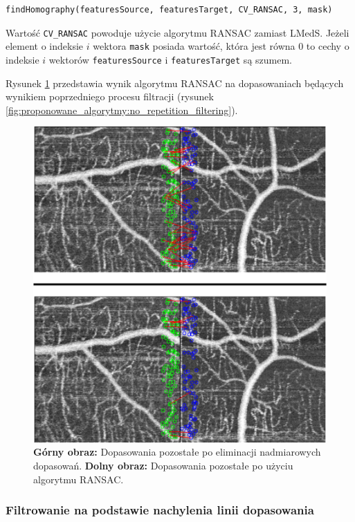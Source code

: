 \begin{verbatim}
findHomography(featuresSource, featuresTarget, CV_RANSAC, 3, mask)
\end{verbatim}

Wartość \texttt{CV\_RANSAC} powoduje użycie algorytmu RANSAC zamiast LMedS. Jeżeli element o indeksie $i$ wektora \texttt{mask} posiada wartość, która jest równa $0$ to cechy o indeksie $i$ wektorów \texttt{featuresSource} i \texttt{featuresTarget} są szumem.

Rysunek \ref{fig:proponowane_algorytmy:ransac_filter} przedstawia wynik algorytmu RANSAC na dopasowaniach będących wynikiem poprzedniego procesu filtracji (rysunek \ref{fig:proponowane_algorytmy:no_repetition_filtering}).

\begin{figure}[htb]
  \centering
  \includegraphics[width=\textwidth]{gfx/ransac_filter}
  \caption{\textbf{Górny obraz:} Dopasowania pozostałe po eliminacji nadmiarowych dopasowań. \textbf{Dolny obraz:} Dopasowania pozostałe po użyciu algorytmu RANSAC.}
  \label{fig:proponowane_algorytmy:ransac_filter}
\end{figure}

\subsubsection{Filtrowanie na podstawie nachylenia linii dopasowania}
\label{sec:proponowane_algorytmy:slope_filtering}

